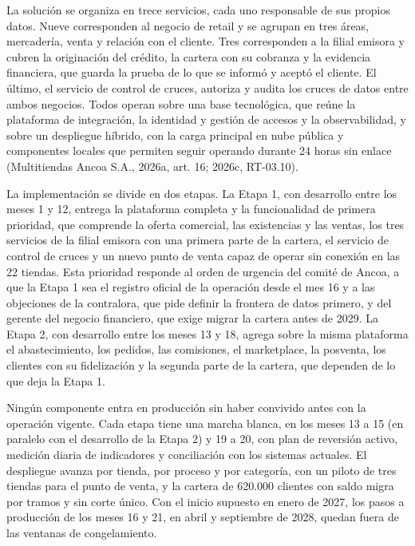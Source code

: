\documentclass[11pt]{article}
\begin{document}
La solución se organiza en trece servicios, cada uno responsable de sus propios datos. Nueve corresponden al negocio de retail y se agrupan en tres áreas, mercadería, venta y relación con el cliente. Tres corresponden a la filial emisora y cubren la originación del crédito, la cartera con su cobranza y la evidencia financiera, que guarda la prueba de lo que se informó y aceptó el cliente. El último, el servicio de control de cruces, autoriza y audita los cruces de datos entre ambos negocios. Todos operan sobre una base tecnológica, que reúne la plataforma de integración, la identidad y gestión de accesos y la observabilidad, y sobre un despliegue híbrido, con la carga principal en nube pública y componentes locales que permiten seguir operando durante 24 horas sin enlace (Multitiendas Ancoa S.A., 2026a, art. 16; 2026c, RT-03.10).


La implementación se divide en dos etapas. La Etapa 1, con desarrollo entre los meses 1 y 12, entrega la plataforma completa y la funcionalidad de primera prioridad, que comprende la oferta comercial, las existencias y las ventas, los tres servicios de la filial emisora con una primera parte de la cartera, el servicio de control de cruces y un nuevo punto de venta capaz de operar sin conexión en las 22 tiendas. Esta prioridad responde al orden de urgencia del comité de Ancoa, a que la Etapa 1 sea el registro oficial de la operación desde el mes 16 y a las objeciones de la contralora, que pide definir la frontera de datos primero, y del gerente del negocio financiero, que exige migrar la cartera antes de 2029. La Etapa 2, con desarrollo entre los meses 13 y 18, agrega sobre la misma plataforma el abastecimiento, los pedidos, las comisiones, el marketplace, la posventa, los clientes con su fidelización y la segunda parte de la cartera, que dependen de lo que deja la Etapa 1.

Ningún componente entra en producción sin haber convivido antes con la operación vigente. Cada etapa tiene una marcha blanca, en los meses 13 a 15 (en paralelo con el desarrollo de la Etapa 2) y 19 a 20, con plan de reversión activo, medición diaria de indicadores y conciliación con los sistemas actuales. El despliegue avanza por tienda, por proceso y por categoría, con un piloto de tres tiendas para el punto de venta, y la cartera de 620.000 clientes con saldo migra por tramos y sin corte único. Con el inicio supuesto en enero de 2027, los pasos a producción de los meses 16 y 21, en abril y septiembre de 2028, quedan fuera de las ventanas de congelamiento.
\end{document}
